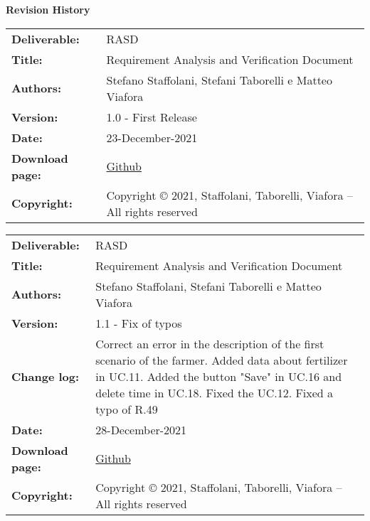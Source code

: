 \textbf{Revision History}
\begin{table}[h!]
\begin{tabu} to \textwidth { X[0.3,r,p] X[0.7,l,p] }
\hline

\textbf{Deliverable:} & RASD\\
\textbf{Title:} & Requirement Analysis and Verification Document \\
\textbf{Authors:} & Stefano Staffolani, Stefani Taborelli e Matteo Viafora \\
\textbf{Version:} & 1.0 - First Release \\ 
\textbf{Date:} & 23-December-2021 \\
\textbf{Download page:} & \href{https://github.com/ViaforaMatteo/StaffolaniTaborelliViafora}{Github} \\
\textbf{Copyright:} & Copyright © 2021, Staffolani, Taborelli, Viafora – All rights reserved \\
\hline
\end{tabu}
\end{table}

\begin{table}[h!]
\begin{tabu} to \textwidth { X[0.3,r,p] X[0.7,l,p] }
\hline

\textbf{Deliverable:} & RASD\\
\textbf{Title:} & Requirement Analysis and Verification Document \\
\textbf{Authors:} & Stefano Staffolani, Stefani Taborelli e Matteo Viafora \\
\textbf{Version:} & 1.1 - Fix of typos\\ 
\textbf{Change log:} & Correct an error in the description of the first scenario of the farmer. Added data about fertilizer in UC.11. Added the button "Save" in UC.16 and delete time in UC.18. Fixed the UC.12. Fixed a typo of R.49\\
\textbf{Date:} & 28-December-2021 \\
\textbf{Download page:} & \href{https://github.com/ViaforaMatteo/StaffolaniTaborelliViafora}{Github} \\
\textbf{Copyright:} & Copyright © 2021, Staffolani, Taborelli, Viafora – All rights reserved \\
\hline
\end{tabu}
\end{table}

